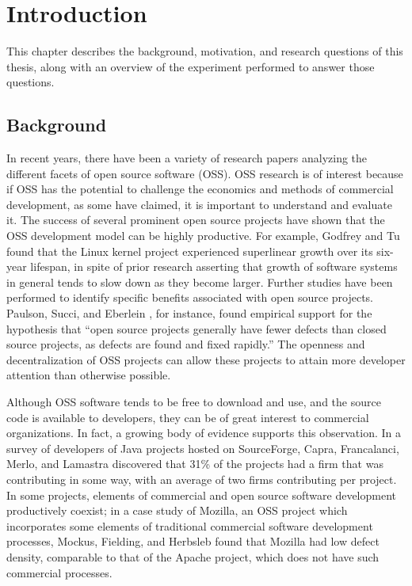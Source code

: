 \chapter{Introduction}
This chapter describes the background, motivation, and research questions of this thesis, along with an overview of the experiment performed to answer those questions.

\section{Background}
In recent years, there have been a variety of research papers analyzing the different facets of open source software (OSS). OSS research is of interest because if OSS has the potential to challenge the economics and methods of commercial development, 
as some have claimed, it is important to understand and evaluate it\cite{mockus2002two}. The success of several prominent open source projects have shown that the OSS development model can be highly productive. For example, Godfrey and Tu \cite{godfrey2000evolution} found that the Linux kernel project experienced superlinear growth over its six-year lifespan, in spite of prior research asserting that growth of software systems in general tends to slow down as they become larger. Further studies have been performed to identify specific benefits associated with open source projects. Paulson, Succi, and Eberlein \cite{paulson2004empirical}, for instance, found empirical support for the hypothesis that ``open source projects generally have fewer defects than closed source projects, as defects are found and fixed rapidly.'' The openness and decentralization of OSS projects can allow these projects to attain more developer attention than otherwise possible.

Although OSS software tends to be free to download and use, and the source code
is available to developers, 
 they can be of great interest to
 commercial organizations. In fact, a growing body of evidence supports this observation.
  In a survey of developers of Java projects hosted on SourceForge, Capra, Francalanci, Merlo, and Lamastra discovered that 31\% of the projects had a firm that was contributing in some way, with an average of two firms contributing per project\cite{capra2009survey}. In some projects, elements of commercial and open source software development productively coexist; in a case study of Mozilla, an OSS project which incorporates some elements of traditional commercial software development processes, Mockus, Fielding, and Herbsleb \cite{mockus2002two} found that Mozilla had low defect density, comparable to that of the Apache project, which does not have such commercial processes.

